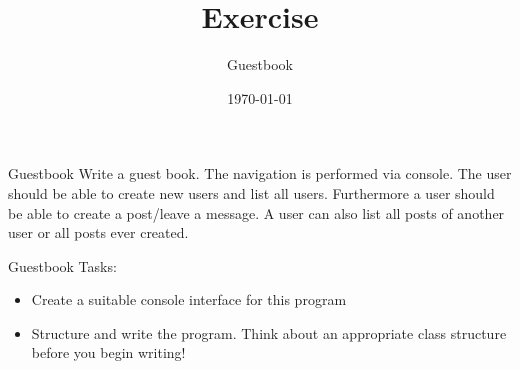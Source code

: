 


\title{Exercise}
\subtitle{Guestbook}
\date{\today}




\begin{frame}
    \titlepage
\end{frame}

\begin{frame}[fragile]{Guestbook}
    Write a guest book. The navigation is performed via console. The user should be able to create new users and list all users. Furthermore a user should be able to create a post/leave a message. A user can also list all posts of another user or all posts ever created.
\end{frame}

\begin{frame}{Guestbook}
    Tasks:
    \begin{itemize}
        \item Create a suitable console interface for this program
        \item Structure and write the program. Think about an appropriate class structure before you begin writing!
    \end{itemize}
\end{frame}



